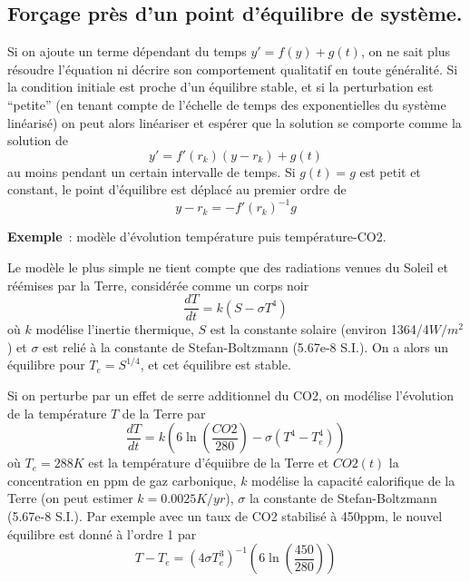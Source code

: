\documentclass[a4paper,11pt]{book}
\begin{document}
\begin{giacjshere}
\subsection{For\c{c}age pr\`es d'un point d'\'equilibre de syst\`eme.}
Si on ajoute un terme d\'ependant du temps $y'=f(y)+g(t)$,
on ne sait plus r\'esoudre l'\'equation ni d\'ecrire
son comportement qualitatif en toute g\'en\'eralit\'e. Si
la condition initiale est proche d'un \'equilibre stable, et si
la perturbation est ``petite'' (en tenant compte de l'\'echelle
de temps des exponentielles du syst\`eme lin\'earis\'e)
on peut alors lin\'eariser et esp\'erer que
la solution se comporte comme la solution de
$$y'=f'(r_k)(y-r_k) + g(t)$$
au moins pendant un certain intervalle de temps.
Si $g(t)=g$ est petit et constant, le point d'\'equilibre est d\'eplac\'e
au premier ordre de
$$ y-r_k=-f'(r_k)^{-1}g$$

{\bf Exemple}~: mod\`ele d'\'evolution temp\'erature puis temp\'erature-CO2.

Le mod\`ele le plus simple ne tient compte que des radiations venues du Soleil
et r\'e\'emises par la Terre, consid\'er\'ee comme un corps noir
\[ \frac{dT}{dt} = k \left( S - \sigma T^4 \right)\]
o\`u $k$ mod\'elise l'inertie thermique, $S$ est la constante solaire 
(environ 1364/4$W/m^2$) et
$\sigma$ est reli\'e \`a la constante de Stefan-Boltzmann (5.67e-8 S.I.).
On a alors un \'equilibre pour $T_e=S^{1/4}$, et cet \'equilibre est stable.

Si on perturbe par un effet de serre additionnel du CO2,
on mod\'elise l'\'evolution de la temp\'erature
$T$ de la Terre par
\[ \frac{dT}{dt} = k \left( 6 \ln (\frac{CO2}{280}) - \sigma (T^4-T_e^4) \right)\]
o\`u $T_e=288K$ est la temp\'erature d'\'equiibre de la Terre et 
$CO2(t)$ la concentration en ppm de gaz carbonique, $k$ mod\'elise
la capacit\'e calorifique de la Terre (on peut estimer $k=0.0025K/yr$),
$\sigma$ la constante de Stefan-Boltzmann (5.67e-8 S.I.).
Par exemple avec un taux de CO2 stabilis\'e \`a 450ppm, le nouvel
\'equilibre est donn\'e \`a l'ordre 1 par
$$ T-T_e=(4\sigma T_e^3)^{-1}(6 \ln (\frac{450}{280})) $$


\end{giacjshere}
\end{document}
